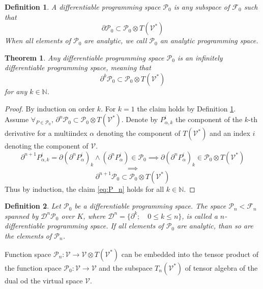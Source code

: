 \documentclass[smallcondensed]{svjour3}
\newcommand{\VV}{\mathcal{V}}
\newcommand{\F}{\mathcal{F}}
\newcommand{\dP}{\mathcal{P}}
\newcommand{\D}{\partial}
\newcommand{\DD}{\mathcal{D}}
\newtheorem{definicija}{Definition}[section]
\newtheorem{izrek}{Theorem}[section]
\begin{document}
 
 \begin{definicija}\label{def:dP}
 	A \emph{differentiable programming space} $\dP_0$ is any subspace of $\F_0$ such that
 	\begin{equation}\label{eq:P}
 	\D\dP_0\subset\dP_0\otimes T(\VV^*)
 	\end{equation}
 	When all elements of $\dP_0$ are analytic, we call $\dP_0$ an \emph{analytic programming space}.
 \end{definicija}
 
\begin{izrek}\label{izr:P}
	Any differentiable programming space $\dP_0$ is an
  infinitely differentiable programming space, meaning that
	\begin{equation}\label{eq:P_n}
	 		\D^k\dP_0\subset\dP_0\otimes T(\VV^*)
	 	\end{equation}
for any $k\in\mathbb{N}$.
\end{izrek}
\begin{proof} By induction on order $k$. For $k=1$ the claim holds by Definition
  \ref{def:dP}. Assume	$\forall_{P\in\dP_0}$,
  $\D^n\dP_0\subset\dP_0\otimes T(\VV^*)$. Denote by $P_{\alpha,k}^i$ the
  component of the $k$-th derivative for a multiindex $\alpha$  denoting the
  component of $T(\VV^*)$ and an index $i$ denoting the component of $\VV$.
	\begin{equation}\label{eq:inductionStep}
\D^{n+1}P_{\alpha,k}^i=\D(\D^n P^i_\alpha)_k\land(\D^n P^i_\alpha)\in\dP_0\implies \D(\D^n P^i_\alpha)_k\in \dP_0\otimes T(\VV^*)
	\end{equation}
	$$\implies$$
	$$\D^{n+1}\dP_0\subset\dP_0\otimes T(\VV^*)$$
Thus by induction, the claim \eqref{eq:P_n} holds for all $k\in \mathbb{N}$. 
\end{proof}

\begin{definicija}
Let $\dP_0$ be a differentiable programming space. The space $\dP_n<\F_n$ spanned by $\DD^n\dP_0$ over $K$, where $\DD^n=\{\partial^k;\quad 0\le k\le n\}$, is called a $n$-differentiable programming space. 
If all elements of $\dP_0$ are analytic, than so are the elements of $\dP_n$.
\end{definicija}


 \begin{corollary}\label{izr:P_n}
 	Function space $\dP_n:\VV\to \VV\otimes T(\VV^*)$ can be embedded into the tensor
  product of the function space $\dP_0:\VV\to \VV$ and the subspace $T_n(\VV^*)$ of
  tensor algebra of the dual od the virtual space $\VV$.
 \end{corollary}
 
\end{document}
